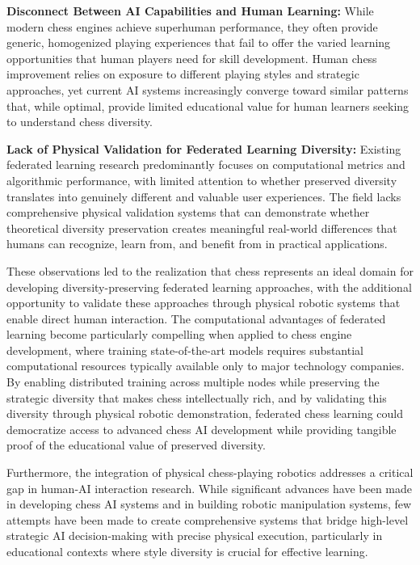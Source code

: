 \textbf{Disconnect Between AI Capabilities and Human Learning:} While modern chess engines achieve superhuman performance, they often provide generic, homogenized playing experiences that fail to offer the varied learning opportunities that human players need for skill development. Human chess improvement relies on exposure to different playing styles and strategic approaches, yet current AI systems increasingly converge toward similar patterns that, while optimal, provide limited educational value for human learners seeking to understand chess diversity.

\textbf{Lack of Physical Validation for Federated Learning Diversity:} Existing federated learning research predominantly focuses on computational metrics and algorithmic performance, with limited attention to whether preserved diversity translates into genuinely different and valuable user experiences. The field lacks comprehensive physical validation systems that can demonstrate whether theoretical diversity preservation creates meaningful real-world differences that humans can recognize, learn from, and benefit from in practical applications.

These observations led to the realization that chess represents an ideal domain for developing diversity-preserving federated learning approaches, with the additional opportunity to validate these approaches through physical robotic systems that enable direct human interaction. The computational advantages of federated learning become particularly compelling when applied to chess engine development, where training state-of-the-art models requires substantial computational resources typically available only to major technology companies. By enabling distributed training across multiple nodes while preserving the strategic diversity that makes chess intellectually rich, and by validating this diversity through physical robotic demonstration, federated chess learning could democratize access to advanced chess AI development while providing tangible proof of the educational value of preserved diversity.

Furthermore, the integration of physical chess-playing robotics addresses a critical gap in human-AI interaction research. While significant advances have been made in developing chess AI systems and in building robotic manipulation systems, few attempts have been made to create comprehensive systems that bridge high-level strategic AI decision-making with precise physical execution, particularly in educational contexts where style diversity is crucial for effective learning.

